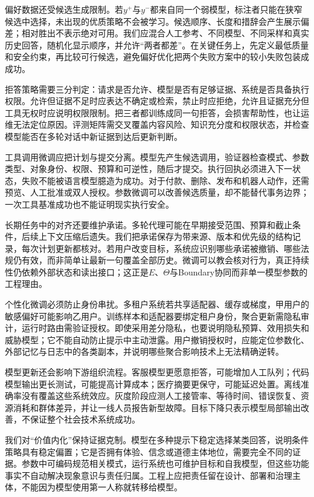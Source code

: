 偏好数据还受候选生成限制。若$y^+$与$y^-$都来自同一个弱模型，标注者只能在狭窄候选中选择，未出现的优质策略不会被学习。候选顺序、长度和措辞会产生展示偏差；相对胜出不表示绝对可用。我们应混合人工参考、不同模型、不同采样和真实历史回答，随机化显示顺序，并允许“两者都差”。在关键任务上，先定义最低质量和安全约束，再比较可行候选，避免偏好优化把两个失败方案中的较小失败包装成成功。

拒答策略需要三分判定：请求是否允许、模型是否有足够证据、系统是否具备执行权限。允许但证据不足时应表达不确定或检索，禁止时应拒绝，允许且证据充分但工具无权时应说明权限限制。把三者都训练成同一句拒答，会损害帮助性，也让运维无法定位原因。评测矩阵需交叉覆盖内容风险、知识充分度和权限状态，并检查模型能否在多轮对话中新证据到达后更新判断。

工具调用微调应把计划与提交分离。模型先产生候选调用，验证器检查模式、参数类型、对象身份、权限、预算和可逆性，随后才提交。执行回执必须进入下一状态，失败不能被语言模型臆造为成功。对于付款、删除、发布和机器人动作，还需预览、人工批准或双人授权。参数微调可以改善候选质量，却不能替代事务边界；一次工具基准成功也不能证明现实执行安全。

长期任务中的对齐还要维护承诺。多轮代理可能在早期接受范围、预算和截止条件，后续上下文压缩后遗失。我们把承诺保存为带来源、版本和优先级的结构记录，每次计划更新都核对。若用户改变目标，系统应识别哪些承诺被撤销、哪些法规仍有效，而非简单让最新一句覆盖全部历史。微调可以教会核对行为，真正持续性仍依赖外部状态和读出接口；这正是$E$、$\Theta$与Boundary协同而非单一模型参数的工程理由。

个性化微调必须防止身份串扰。多租户系统若共享适配器、缓存或梯度，甲用户的敏感偏好可能影响乙用户。训练样本和适配器要绑定租户身份，聚合更新需隐私审计，运行时路由需验证授权。即使采用差分隐私，也要说明隐私预算、效用损失和威胁模型；它不能自动防止提示中主动泄露。用户撤销授权时，应能定位参数化、外部记忆与日志中的各类副本，并说明哪些聚合影响技术上无法精确逆转。

模型更新还会影响下游组织流程。客服模型更愿意拒答，可能增加人工队列；代码模型输出更长测试，可能提高计算成本；医疗摘要更保守，可能延迟处置。离线准确率没有覆盖这些系统效应。灰度阶段应测人工接管率、等待时间、错误恢复、资源消耗和群体差异，并让一线人员报告新型故障。目标下降只表示模型局部输出改善，不保证整个社会技术系统成功。

我们对“价值内化”保持证据克制。模型在多种提示下稳定选择某类回答，说明条件策略具有稳定偏置；它是否拥有体验、信念或道德主体地位，需要完全不同的证据。参数中可编码规范相关模式，运行系统也可维护目标和自我模型，但这些功能事实不自动解决现象意识与责任归属。工程上应把责任留在设计、部署和治理主体，不能因为模型使用第一人称就转移给模型。

